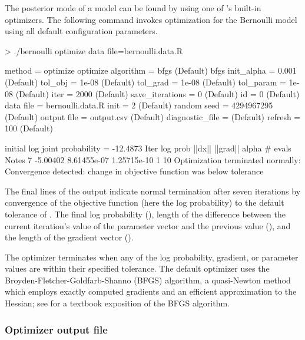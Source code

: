 \documentclass[article]{jss}
\begin{document}
The posterior mode of a model can be found by using one of
's built-in optimizers.  The following command invokes
optimization for the Bernoulli model using all default configuration
parameters.
%
\begin{CodeChunk}
\begin{CodeInput}
> ./bernoulli optimize data file=bernoulli.data.R 
\end{CodeInput}
\begin{CodeOutput}
 method = optimize
   optimize
     algorithm = bfgs (Default)
       bfgs
         init_alpha = 0.001 (Default)
         tol_obj = 1e-08 (Default)
         tol_grad = 1e-08 (Default)
         tol_param = 1e-08 (Default)
     iter = 2000 (Default)
     save_iterations = 0 (Default)
 id = 0 (Default)
 data
   file = bernoulli.data.R
 init = 2 (Default)
 random
   seed = 4294967295 (Default)
 output
   file = output.csv (Default)
   diagnostic_file =  (Default)
   refresh = 100 (Default)

initial log joint probability = -12.4873
    Iter      log prob        ||dx||      ||grad||   alpha  # evals  Notes 
       7      -5.00402   8.61455e-07   1.25715e-10       1       10   
Optimization terminated normally: 
  Convergence detected: change in objective function was below
  tolerance
\end{CodeOutput}
\end{CodeChunk}
%
The final lines of the output indicate normal termination after seven
iterations by convergence of the objective function (here the log
probability) to the default tolerance of . The final log
probability (), length of the difference between the
current iteration's value of the parameter vector and the previous
value (), and the length of the gradient vector
().

The optimizer terminates when any of the log probability, gradient, or
parameter values are within their specified tolerance.  The default
optimizer uses the Broyden-Fletcher-Goldfarb-Shanno (BFGS) algorithm,
a quasi-Newton method which employs exactly computed gradients and an
efficient approximation to the Hessian; see \citep{NocedalWright:2006}
for a textbook exposition of the BFGS algorithm.

\subsubsection{Optimizer output file}
\end{document}
